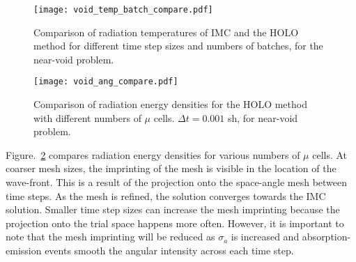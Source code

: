 \begin{figure}[H]
  \centering
    \texttt{[image: void\_temp\_batch\_compare.pdf]}
    \caption{\label{fig:void_temp_compare} Comparison of radiation temperatures of IMC and
    the HOLO method for different time step sizes and numbers of batches, for the
near-void problem.}
\end{figure}

\begin{figure}[H]
  \centering
    \texttt{[image: void\_ang\_compare.pdf]}
    \caption{\label{fig:bumps} Comparison of radiation energy densities for
    the HOLO method with different numbers of $\mu$ cells. $\Delta t=0.001$ sh, for
near-void problem.}
\end{figure}

Figure.~\ref{fig:bumps} compares radiation energy densities for various numbers of $\mu$
cells.  At coarser mesh sizes, the imprinting of the mesh is visible in the location of
the wave-front.  This is a result of the projection onto the space-angle mesh between time
steps.  As the mesh is refined, the solution converges towards the IMC solution.  
Smaller time step sizes can increase the mesh imprinting because the projection onto the
trial space happens more often.  However, it is important
to note that the mesh imprinting will be reduced as $\sigma_a$ is increased and
absorption-emission events smooth the angular intensity across each time step.

